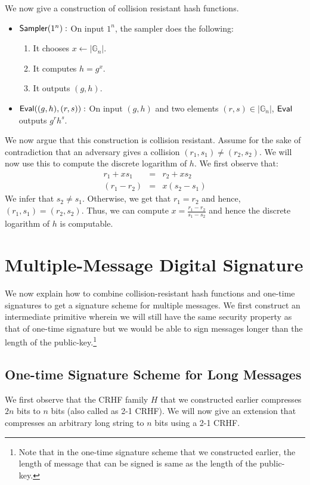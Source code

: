 \documentclass[12pt]{tufte-book}
\begin{document}
We now give a construction of collision resistant hash functions.  

\begin{itemize}
\item $\mathsf{Sampler}(1^n):$ On input $1^n$, the sampler does the following:
\begin{enumerate}
    \item It chooses $x \gets |\mathbb{G}_n|$.
    \item It computes $h = g^x$.
    \item It outputs $(g,h)$.

\end{enumerate}
\item $\mathsf{Eval}((g,h),(r,s)):$ On input $(g,h)$ and two elements $(r,s) \in |\mathbb{G}_n|$, $\mathsf{Eval}$ outputs $g^rh^s$.
\end{itemize}

We now argue that this construction is collision resistant. Assume for the sake of contradiction that an adversary gives a collision $(r_1,s_1) \neq (r_2,s_2)$. We will now use this to compute the discrete logarithm of $h$. We first observe that:
\begin{eqnarray*}
r_1+xs_1 &=& r_2 + xs_2\\
(r_1 - r_2) &=& x(s_2 - s_1)
\end{eqnarray*}
We infer that $s_2 \neq s_1$. Otherwise, we get that $r_1 = r_2$ and hence, $(r_1,s_1) = (r_2,s_2)$. Thus, we can compute $x = \frac{r_1-r_2}{s_1 - s_2}$ and hence the discrete logarithm of $h$ is computable.


\section{Multiple-Message Digital Signature}

We now explain how to combine collision-resistant hash functions and one-time signatures to get a signature scheme for multiple messages. We first construct an intermediate primitive wherein we will still have the same security property as that of one-time signature but we would be able to sign messages longer than the length of the public-key.\footnote{Note that in the one-time signature scheme that we constructed earlier, the length of message that can be signed is same as the length of the public-key.}


\subsection{One-time Signature Scheme for Long Messages}
We first observe that the CRHF family $H$ that we constructed earlier compresses $2n$ bits to $n$ bits (also called as 2-1 CRHF). We will now give an extension that compresses an arbitrary long string to $n$ bits using a 2-1 CRHF.
\end{document}

